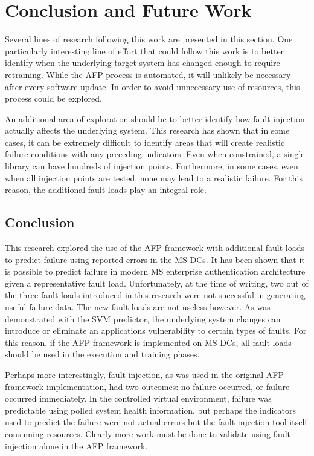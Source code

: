 \section{Conclusion and Future Work} \label{chapter5}
Several lines of research following this work are presented in this section.
One particularly interesting line of effort that could follow this work is to
better identify when the underlying target system has changed enough to require
retraining.  While the \ac{AFP} process is automated, it will unlikely be
necessary after every software update.  In order to avoid unnecessary use of
resources, this process could be explored.

An additional area of exploration should be to better identify how fault
injection actually affects the underlying system.  This research has shown that
in some cases, it can be extremely difficult to identify areas that will create
realistic failure conditions with any preceding indicators.  Even when
constrained, a single library can have hundreds of injection points.
Furthermore, in some cases, even when all injection points are tested, none may
lead to a realistic failure.  For this reason, the additional fault loads play
an integral role.

\subsection{Conclusion}
This research explored the use of the \ac{AFP} framework with additional fault
loads to predict failure using reported errors in the \ac{MS} \ac{DC}s.  It has
been shown that it is possible to predict failure in modern \ac{MS} enterprise
authentication architecture given a representative fault load.  Unfortunately,
at the time of writing, two out of the three fault loads introduced in this
research were not successful in generating useful failure data.  The new fault
loads are not useless however.  As was demonstrated with the \ac{SVM}
predictor, the underlying system changes can introduce or eliminate an
applications vulnerability to certain types of faults.  For this reason, if the
\ac{AFP} framework is implemented on \ac{MS} \ac{DC}s, all fault loads should
be used in the execution and training phases.

Perhaps more interestingly, fault injection, as was used in the original
\ac{AFP} framework implementation, had two outcomes: no failure occurred, or
failure occurred immediately.  In the controlled virtual environment, failure
was predictable using polled system health information, but perhaps the
indicators used to predict the failure were not actual errors but the fault
injection tool itself consuming resources.  Clearly more work must be done to
validate using fault injection alone in the \ac{AFP} framework.

